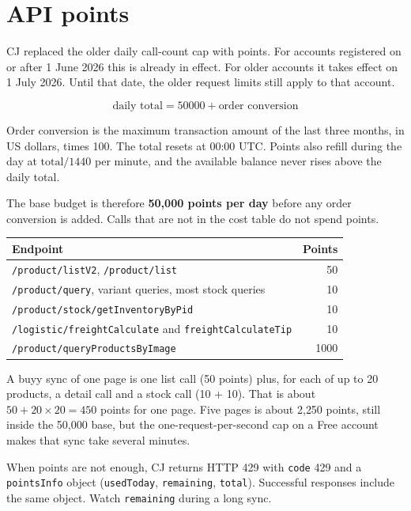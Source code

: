 \documentclass[11pt]{article}
\begin{document}
\section{API points}

CJ replaced the older daily call-count cap with points. For accounts registered on or after 1 June 2026 this is already in effect. For older accounts it takes effect on 1 July 2026. Until that date, the older request limits still apply to that account.

\[
\text{daily total} = 50000 + \text{order conversion}
\]

Order conversion is the maximum transaction amount of the last three months, in US dollars, times 100. The total resets at 00:00 UTC. Points also refill during the day at \(\text{total}/1440\) per minute, and the available balance never rises above the daily total.

The base budget is therefore \textbf{50{,}000 points per day} before any order conversion is added. Calls that are not in the cost table do not spend points.

\begin{center}
\begin{tabular}{@{}lr@{}}
\toprule
Endpoint & Points \\
\midrule
\texttt{/product/listV2}, \texttt{/product/list} & 50 \\
\texttt{/product/query}, variant queries, most stock queries & 10 \\
\texttt{/product/stock/getInventoryByPid} & 10 \\
\texttt{/logistic/freightCalculate} and \texttt{freightCalculateTip} & 10 \\
\texttt{/product/queryProductsByImage} & 1000 \\
\bottomrule
\end{tabular}
\end{center}

A buyy sync of one page is one list call (50 points) plus, for each of up to 20 products, a detail call and a stock call (10 + 10). That is about \(50 + 20 \times 20 = 450\) points for one page. Five pages is about 2{,}250 points, still inside the 50{,}000 base, but the one-request-per-second cap on a Free account makes that sync take several minutes.

When points are not enough, CJ returns HTTP 429 with \texttt{code} 429 and a \texttt{pointsInfo} object (\texttt{usedToday}, \texttt{remaining}, \texttt{total}). Successful responses include the same object. Watch \texttt{remaining} during a long sync.
\end{document}

